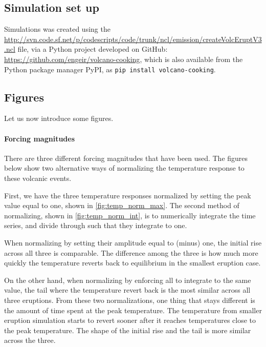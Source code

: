 \documentclass{ametsocV5}
\begin{document}
\subsection{Simulation set up}

Simulations was created using the
\url{http://svn.code.sf.net/p/codescripts/code/trunk/ncl/emission/createVolcEruptV3.ncl}
file, via a Python project developed on GitHub:
\url{https://github.com/engeir/volcano-cooking}, which is also available from the Python
package manager PyPI, as \texttt{pip install volcano-cooking}.

\subsection{Figures}

Let us now introduce some figures.

\paragraph*{Forcing magnitudes}

There are three different forcing magnitudes that have been used. The figures below show
two alternative ways of normalizing the temperature response to these volcanic events.

First, we have the three temperature responses normalized by setting the peak value
equal to one, shown in \cref{fig:temp_norm_max}. The second method of normalizing, shown
in \cref{fig:temp_norm_int}, is to numerically integrate the time series, and divide
through such that they integrate to one.

When normalizing by setting their amplitude equal to (minus) one, the initial rise
across all three is comparable. The difference among the three is how much more quickly
the temperature reverts back to equilibrium in the smallest eruption case.

On the other hand, when normalizing by enforcing all to integrate to the same value, the
tail where the temperature revert back is the most similar across all three eruptions.
From these two normalizations, one thing that stays different is the amount of time
spent at the peak temperature. The temperature from smaller eruption simulation starts
to revert sooner after it reaches temperatures close to the peak temperature. The shape
of the initial rise and the tail is more similar across the three.
\end{document}
